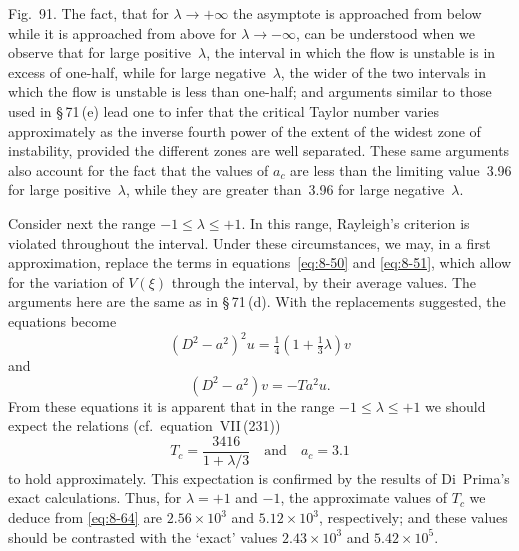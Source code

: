 
Fig.~91. The fact, that for $\lambda \to +\infty$ the asymptote is approached from below while it is approached from above for $\lambda\to-\infty$, can be understood when we observe that for large positive~$\lambda$, the interval in which the flow is unstable is in excess of one-half, while for large negative~$\lambda$, the wider of the two intervals in which the flow is unstable is less than one-half; and arguments similar to those used in \S\,71\,(e) lead one to infer that the critical Taylor number varies approximately as the inverse fourth power of the extent of the widest zone of instability, provided the different zones are well separated. These same arguments also account for the fact that the values of $a_c$ are less than the limiting value~3.96 for large positive~$\lambda$, while they are greater than~3.96 for large negative~$\lambda$.

Consider next the range $-1 \leqslant \lambda \leqslant +1$. In this range, Rayleigh's criterion is violated throughout the interval. Under these circumstances, we may, in a first approximation, replace the terms in equations~\eqref{eq:8-50} and \eqref{eq:8-51}, which allow for the variation of $V(\xi)$ through the interval, by their average values. The arguments here are the same as in \S\,71\,(d). With the replacements suggested, the equations become
\begin{equation}
\label{eq:8-62}
(D^2 - a^2)^2 u = \tfrac{1}{4}(1+\tfrac{1}{3}\lambda)v
\end{equation}
and
\begin{equation}
\label{eq:8-63}
(D^2 - a^2)v = -Ta^2 u.
\end{equation}
From these equations it is apparent that in the range $-1 \leqslant \lambda \leqslant +1$ we should expect the relations (cf.\ equation~VII\,(231))
\begin{equation}
\label{eq:8-64}
T_c = \frac{3416}{1+\lambda/3} \quad \text{and} \quad a_c = 3.1
\end{equation}
to hold approximately. This expectation is confirmed by the results of Di~Prima's exact calculations. Thus, for $\lambda = +1$ and $-1$, the approximate values of $T_c$ we deduce from \eqref{eq:8-64} are $2.56\times 10^3$ and $5.12\times 10^3$, respectively; and these values should be contrasted with the `exact' values $2.43\times 10^3$ and $5.42\times 10^5$.

